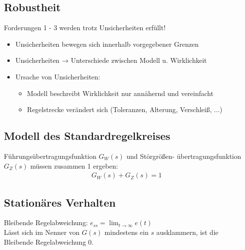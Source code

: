 \documentclass[german]{latex4ei/latex4ei_sheet}
\begin{document}
\begin{sectionbox}
    \subsection{Robustheit}
    \vspace{1mm}
    Forderungen 1 - 3 werden trotz Unsicherheiten erfüllt!
    \begin{itemize}
        \item Unsicherheiten bewegen sich innerhalb vorgegebener Grenzen
        \item Unsicherheiten → Unterschiede zwischen Modell u. Wirklichkeit
        \item Ursache von Unsicherheiten:
        \begin{itemize}
            \item Modell beschreibt Wirklichkeit nur annähernd und vereinfacht
            \item Regelstrecke verändert sich (Toleranzen, Alterung, Verschleiß, ...)
        \end{itemize}
    \end{itemize}
    
\end{sectionbox}
    \begin{sectionbox}
        \subsection{Modell des Standardregelkreises}
        \vspace{1mm}
        Führungsübertragungsfunktion $G_{W}(s)$ und Störgrößen- übertragungsfunktion $G_{Z}(s)$ müssen zusammen 1 ergeben:
        \begin{align*}
            G_{W}(s) + G_{Z}(s) = 1
        \end{align*}


        \subsection{Stationäres Verhalten}
        \vspace{1mm}
        Bleibende Regelabweichung: $e_{ss} = \lim_{t \to \infty} e(t)$ \\
        Lässt sich im Nenner von $G(s)$ mindestens ein $s$ ausklammern, ist die Bleibende Regelabweichung $0$.
    \end{sectionbox}
\end{document}
